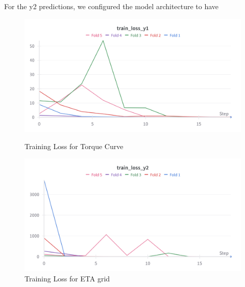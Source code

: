 \documentclass{report} %
\begin{document}
For the y2 predictions, we configured the model architecture to have 
\begin{figure}[h]
    \centering
    \begin{minipage}[b]{0.3\textwidth}
        \includegraphics[width=\textwidth]{./ReportImages/train_loss_y1.png}
        \caption{Training Loss for Torque Curve}
        \label{fig:Training Loss for Torque Curve}
    \end{minipage}
    \hfill
    \begin{minipage}[b]{0.3\textwidth}
        \includegraphics[width=\textwidth]{./ReportImages/train_loss_y2.png}
        \caption{Training Loss for ETA grid}
        \label{fig:Training Loss for ETA grid}
    \end{minipage}
\end{figure}
\end{document}
